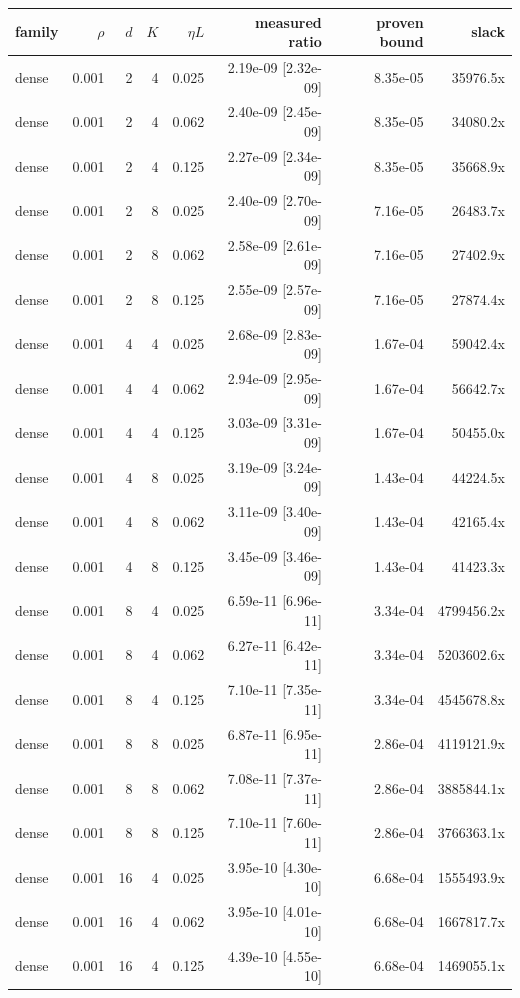 \begin{tabular}{lrrrrrrr}
\toprule
family & $\rho$ & $d$ & $K$ & $\eta L$ & measured ratio & proven bound & slack \\
\midrule
dense & 0.001 & 2 & 4 & 0.025 & 2.19e-09 [2.32e-09] & 8.35e-05 & 35976.5x \\
dense & 0.001 & 2 & 4 & 0.062 & 2.40e-09 [2.45e-09] & 8.35e-05 & 34080.2x \\
dense & 0.001 & 2 & 4 & 0.125 & 2.27e-09 [2.34e-09] & 8.35e-05 & 35668.9x \\
dense & 0.001 & 2 & 8 & 0.025 & 2.40e-09 [2.70e-09] & 7.16e-05 & 26483.7x \\
dense & 0.001 & 2 & 8 & 0.062 & 2.58e-09 [2.61e-09] & 7.16e-05 & 27402.9x \\
dense & 0.001 & 2 & 8 & 0.125 & 2.55e-09 [2.57e-09] & 7.16e-05 & 27874.4x \\
dense & 0.001 & 4 & 4 & 0.025 & 2.68e-09 [2.83e-09] & 1.67e-04 & 59042.4x \\
dense & 0.001 & 4 & 4 & 0.062 & 2.94e-09 [2.95e-09] & 1.67e-04 & 56642.7x \\
dense & 0.001 & 4 & 4 & 0.125 & 3.03e-09 [3.31e-09] & 1.67e-04 & 50455.0x \\
dense & 0.001 & 4 & 8 & 0.025 & 3.19e-09 [3.24e-09] & 1.43e-04 & 44224.5x \\
dense & 0.001 & 4 & 8 & 0.062 & 3.11e-09 [3.40e-09] & 1.43e-04 & 42165.4x \\
dense & 0.001 & 4 & 8 & 0.125 & 3.45e-09 [3.46e-09] & 1.43e-04 & 41423.3x \\
dense & 0.001 & 8 & 4 & 0.025 & 6.59e-11 [6.96e-11] & 3.34e-04 & 4799456.2x \\
dense & 0.001 & 8 & 4 & 0.062 & 6.27e-11 [6.42e-11] & 3.34e-04 & 5203602.6x \\
dense & 0.001 & 8 & 4 & 0.125 & 7.10e-11 [7.35e-11] & 3.34e-04 & 4545678.8x \\
dense & 0.001 & 8 & 8 & 0.025 & 6.87e-11 [6.95e-11] & 2.86e-04 & 4119121.9x \\
dense & 0.001 & 8 & 8 & 0.062 & 7.08e-11 [7.37e-11] & 2.86e-04 & 3885844.1x \\
dense & 0.001 & 8 & 8 & 0.125 & 7.10e-11 [7.60e-11] & 2.86e-04 & 3766363.1x \\
dense & 0.001 & 16 & 4 & 0.025 & 3.95e-10 [4.30e-10] & 6.68e-04 & 1555493.9x \\
dense & 0.001 & 16 & 4 & 0.062 & 3.95e-10 [4.01e-10] & 6.68e-04 & 1667817.7x \\
dense & 0.001 & 16 & 4 & 0.125 & 4.39e-10 [4.55e-10] & 6.68e-04 & 1469055.1x \\

\end{tabular}

